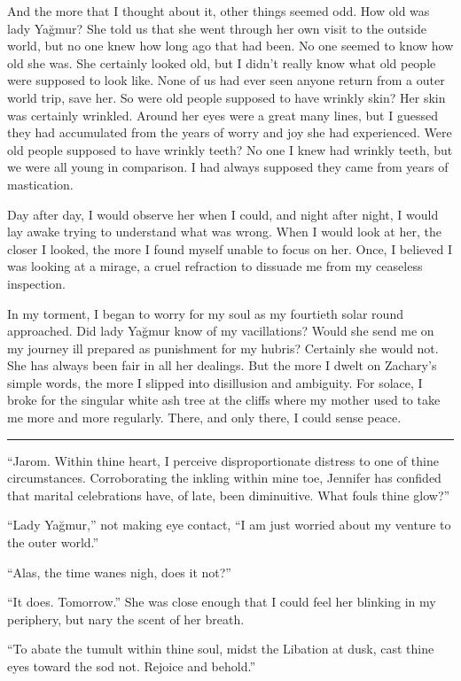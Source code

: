 And the more that I thought about it, other things seemed odd. How old was lady Yağmur? She told us
that she went through her own visit to the outside world, but no one knew how long ago that had
been. No one seemed to know how old she was. She certainly looked old, but I didn't really know what
old people were supposed to look like. None of us had ever seen anyone return from a outer world
trip, save her. So were old people supposed to have wrinkly skin? Her skin was certainly wrinkled.
Around her eyes were a great many lines, but I guessed they had accumulated from the years of worry
and joy she had experienced. Were old people supposed to have wrinkly teeth? No one I knew had
wrinkly teeth, but we were all young in comparison. I had always supposed they came from years of mastication.

Day after day, I would observe her when I could, and night after night, I would lay awake trying to
understand what was wrong. When I would look at her, the closer I looked, the more I found myself
unable to focus on her. Once, I believed I was looking at a mirage, a cruel refraction to dissuade
me from my ceaseless inspection.

In my torment, I began to worry for my soul as my fourtieth solar round approached. Did lady
Yağmur know of my vacillations? Would she send me on my journey ill prepared as punishment for my
hubris? Certainly she would not. She has always been fair in all her dealings. But the more I dwelt
on Zachary's simple words, the more I slipped into disillusion and ambiguity. For solace, I broke
for the singular white ash tree at the cliffs where my mother used to take me more and more
regularly. There, and only there, I could sense peace.

\noindent\rule{\textwidth}{1pt}

``Jarom. Within thine heart, I perceive disproportionate distress to one of thine circumstances.
Corroborating the inkling within mine toe, Jennifer has confided that marital celebrations have, of
late, been diminuitive. What fouls thine glow?''

``Lady Yağmur,'' not making eye contact, ``I am just worried about my venture to the outer world.''

``Alas, the time wanes nigh, does it not?''

``It does. Tomorrow.'' She was close enough that I could feel her blinking in my periphery, but nary
the scent of her breath.

``To abate the tumult within thine soul, midst the Libation at dusk, cast thine eyes toward the sod
not. Rejoice and behold.''

